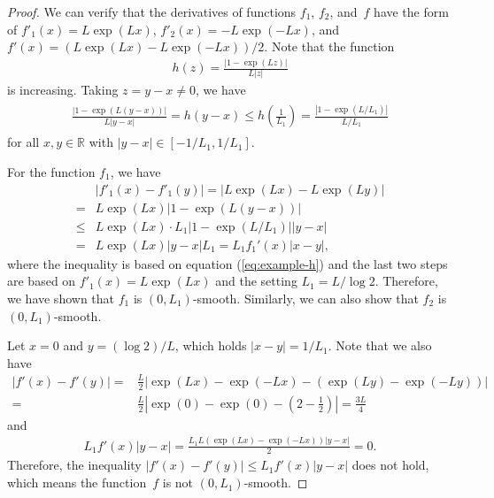\documentclass[sigconf]{acmart}
\def\BR{{\mathbb{R}}}
\theoremstyle{plain}
\begin{document}
\begin{proof}
We can verify that the derivatives of functions $f_1$, $f_2$, and~$f$ have the form of $f'_1(x) = L\exp(Lx)$, $f'_2(x) = -L\exp(-Lx)$, and $f'(x) = (L\exp(Lx)-L\exp(-Lx))/{2}$.
Note that the function
\begin{align*}
    h(z) = \frac{|1-\exp(Lz)|}{L|z|} 
\end{align*}
is increasing.
Taking $z=y-x\neq 0$, we have
\begin{align}\label{eq:example-h}
\begin{split}    
  \frac{|1-\exp(L(y-x))|}{L|y-x|} 
= h(y-x)  
\leq   h\left(\frac{1}{L_1}\right)  
= \frac{|1-\exp(L/L_1)|}{L/L_1}
\end{split}
\end{align}
for all $x,y\in\BR$ with $|y-x|\in[-1/L_1, 1/L_1]$.

For the function $f_1$, we have
\begin{align*}
  &  |f'_1(x) - f'_1(y)|  
=   |L\exp(Lx) - L\exp(Ly)| \\
= & L\exp(Lx)|1-\exp(L(y-x))|  \\
\leq &  L\exp(Lx) \cdot L_1|1-\exp(L/L_1)||y-x|  \\
= & L \exp(Lx) |y-x| L_1 
=   L_1 f_1'(x)|x-y|,
\end{align*}
where the inequality is based on equation (\ref{eq:example-h}) and the last two steps are based on $f'_1(x) = L\exp(Lx)$ and the setting $L_1=L/\log 2$.
Therefore, we have shown that $f_1$ is $(0,L_1)$-smooth. 
Similarly, we can also show that $f_2$ is $(0,L_1)$-smooth. 

Let $x=0$ and $y=(\log 2)/L$, which holds $|x-y|=1/L_1$.
Note that we also have
\begin{align*}
    |f'(x) - f'(y)|  
=& \frac{L}{2}\left|\exp(Lx)\!-\!\exp(-Lx) -(\exp(Ly)\!-\!\exp(-Ly))\right| \\
=& \frac{L}{2}\left|\exp(0)-\exp(0) -\left(2-\frac{1}{2}\right)\right| = \frac{3L}{4}
\end{align*}
and
\begin{align*}
    L_1f'(x)|y-x| = \frac{L_1L(\exp(Lx)-\exp(-Lx))|y-x|}{2} = 0.
\end{align*}
Therefore, the inequality $|f'(x) - f'(y)| \leq L_1 f'(x)|y-x|$ does not hold, which means the function~$f$ is not $(0,L_1)$-smooth.
\end{proof}

\end{document}
